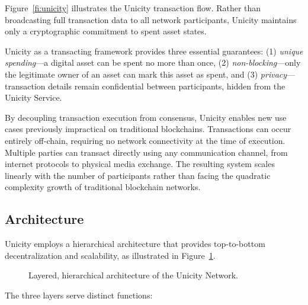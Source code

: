\documentclass{article}
\begin{document}
Figure~\ref{fi:unicity} illustrates the Unicity transaction flow. Rather than broadcasting full transaction data to all network participants, Unicity maintains only a cryptographic commitment to spent asset states.

Unicity as a transacting framework provides three essential guarantees: (1) \emph{unique spending}—a digital asset can be spent no more than once, (2) \emph{non-blocking}—only the legitimate owner of an asset can mark this asset as spent, and (3) \emph{privacy}—transaction details remain confidential between participants, hidden from the Unicity Service.

By decoupling transaction execution from consensus, Unicity enables new use cases previously impractical on traditional blockchains. Transactions can occur entirely off-chain, requiring no network connectivity at the time of execution. Multiple parties can transact directly using any communication channel, from internet protocols to physical media exchange. The resulting system scales linearly with the number of participants rather than facing the quadratic complexity growth of traditional blockchain networks.

\subsection{Architecture}

Unicity employs a hierarchical architecture that provides top-to-bottom decentralization and scalability, as illustrated in Figure~\ref{fig:layers}.

\begin{figure}[!htbp]
    \centering
    \caption{Layered, hierarchical architecture of the Unicity Network.}\label{fig:layers}
\end{figure}

The three layers serve distinct functions:
\end{document}
